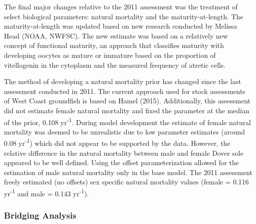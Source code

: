 \documentclass[11pt,
  english,
  a4paper,
]{article}
\begin{document}
The final major changes relative to the 2011 assessment was the treatment of select biological parameters: natural mortality and the maturity-at-length. The maturity-at-length was updated based on new research conducted by Melissa Head (NOAA, NWFSC). The new estimate was based on a relatively new concept of functional maturity, an approach that classifies maturity with developing oocytes as mature or immature based on the proportion of vitellogenin in the cytoplasm and the measured frequency of atretic cells.

\leavevmode\tagmcend\tagstructend\par


The method of developing a natural mortality prior has changed since the last assessment conducted in 2011. The current approach used for stock assessments of West Coast groundfish is based on Hamel {(2015)\leavevmode\tagmcend\tagstructend}. Additionally, this assessment did not estimate female natural mortality and fixed the parameter at the median of the prior, 0.108 yr\textsuperscript{-1}. During model development the estimate of female natural mortality was deemed to be unrealistic due to low parameter estimates (around 0.08 yr\textsuperscript{-1}) which did not appear to be supported by the data. However, the relative difference in the natural mortality between male and female Dover sole appeared to be well defined. Using the offset parameterization allowed for the estimation of male natural mortality only in the base model. The 2011 assessment freely estimated (no offsets) sex specific natural mortality values (female = 0.116 yr\textsuperscript{-1} and male = 0.143 yr\textsuperscript{-1}).

\leavevmode\tagmcend\tagstructend\par


\hypertarget{bridging-analysis}{%
\subsubsection{Bridging Analysis}\label{bridging-analysis}}

\leavevmode\tagmcend\tagstructend

\end{document}
